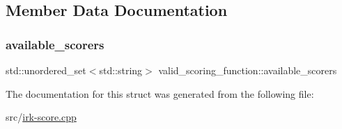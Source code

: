 \subsection{Member Data Documentation}
\mbox{\label{structvalid__scoring__function_a0beb8d648a26285eeb98019828b90ed1}} 
\subsubsection{\texorpdfstring{available\+\_\+scorers}{available\_scorers}}
{\footnotesize\ttfamily std\+::unordered\+\_\+set$<$std\+::string$>$ valid\+\_\+scoring\+\_\+function\+::available\+\_\+scorers}



The documentation for this struct was generated from the following file\+:\begin{DoxyCompactItemize}
\item 
src/\mbox{\hyperlink{irk-score_8cpp}{irk-\/score.\+cpp}}\end{DoxyCompactItemize}
